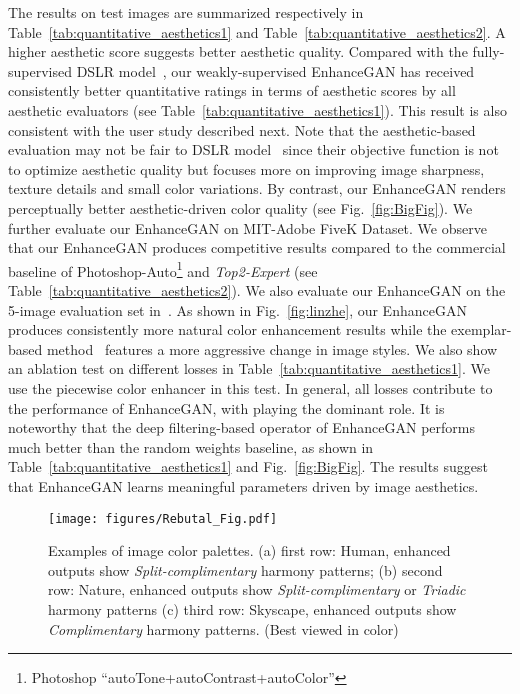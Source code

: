 \documentclass[sigconf]{acmart}
\begin{document}
The results on test images are summarized respectively in Table~\ref{tab:quantitative_aesthetics1} and Table~\ref{tab:quantitative_aesthetics2}.
A higher aesthetic score suggests better aesthetic quality. 
Compared with the fully-supervised DSLR model~\cite{ignatov2017dslr}, our weakly-supervised EnhanceGAN has received consistently better quantitative ratings in terms of aesthetic scores by all aesthetic evaluators (see Table~\ref{tab:quantitative_aesthetics1}). This result is also consistent with the user study described next. Note that the aesthetic-based evaluation may not be fair to DSLR model~\cite{ignatov2017dslr} since their objective function is not to optimize aesthetic quality but focuses more on improving image sharpness, texture details and small color variations.
By contrast, our EnhanceGAN renders perceptually better aesthetic-driven color quality (see Fig.~\ref{fig:BigFig}). 
\color{black}
We further evaluate our EnhanceGAN on MIT-Adobe FiveK Dataset. We observe that our EnhanceGAN produces competitive results compared to the commercial baseline of Photoshop-Auto\footnote{Photoshop ``autoTone+autoContrast+autoColor''} and \textit{Top2-Expert} (see Table~\ref{tab:quantitative_aesthetics2}).
\color{black}
We also evaluate our EnhanceGAN on the 5-image evaluation set in~\cite{lee2016automatic}. As shown in Fig.~\ref{fig:linzhe}, our EnhanceGAN produces consistently more natural color enhancement results while the exemplar-based method~\cite{lee2016automatic} features a more aggressive change in image styles.
We also show an ablation test on different losses in Table~\ref{tab:quantitative_aesthetics1}. We use the piecewise color enhancer in this test. In general, all losses contribute to the performance of EnhanceGAN, with  playing the dominant role.
It is noteworthy that the deep filtering-based operator of EnhanceGAN performs much better than the random weights baseline, as shown in Table~\ref{tab:quantitative_aesthetics1} and Fig.~\ref{fig:BigFig}. The results suggest that EnhanceGAN learns meaningful parameters driven by image aesthetics.
\begin{figure}[t]
\begin{center}
\texttt{[image: figures/Rebutal\_Fig.pdf]}
\end{center}
\vskip -0.4cm
\caption[]{Examples of image color palettes. (a) first row: Human, enhanced outputs show \textit{Split-complimentary} harmony patterns; (b) second row: Nature, enhanced outputs show \textit{Split-complimentary} or \textit{Triadic} harmony patterns (c) third row: Skyscape, enhanced outputs show \textit{Complimentary} harmony patterns. (Best viewed in color)}
\label{fig:color_harmony}
\end{figure}
\end{document}
